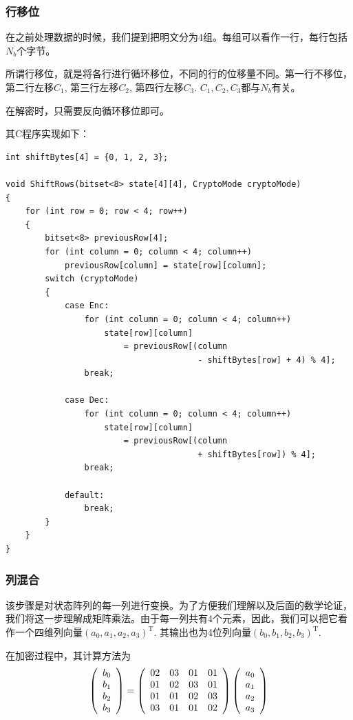 \subsubsection{行移位}
在之前处理数据的时候，我们提到把明文分为4组。每组可以看作一行，每行包括$N_b$个字节。\par
所谓行移位，就是将各行进行循环移位，不同的行的位移量不同。第一行不移位，第二行左移$C_1$, 第三行左移$C_2$, 第四行左移$C_3$. $C_1, C_2, C_3$都与$N_b$有关。\par
在解密时，只需要反向循环移位即可。\par
其C程序实现如下：
\begin{prove}
\begin{verbatim}
int shiftBytes[4] = {0, 1, 2, 3};

void ShiftRows(bitset<8> state[4][4], CryptoMode cryptoMode)
{
    for (int row = 0; row < 4; row++)
    {
        bitset<8> previousRow[4];
        for (int column = 0; column < 4; column++)
            previousRow[column] = state[row][column];
        switch (cryptoMode)
        {
            case Enc:
                for (int column = 0; column < 4; column++)
                    state[row][column]
                        = previousRow[(column
                                       - shiftBytes[row] + 4) % 4];
                break;
                
            case Dec:
                for (int column = 0; column < 4; column++)
                    state[row][column]
                        = previousRow[(column
                                       + shiftBytes[row]) % 4];
                break;
                
            default:
                break;
        }
    }
}
\end{verbatim}
\end{prove}
\subsubsection{列混合}
该步骤是对状态阵列的每一列进行变换。为了方便我们理解以及后面的数学论证，我们将这一步理解成矩阵乘法。由于每一列共有4个元素，因此，我们可以把它看作一个四维列向量$(a_0, a_1, a_2, a_3)^{\mathrm{T}}$. 其输出也为4位列向量$(b_0, b_1, b_2, b_3)^{\mathrm{T}}$.\par
在加密过程中，其计算方法为
\begin{equation}
\left( {\begin{array}{c}b_0\\b_1\\b_2\\b_3\end{array}}\right)=\left( {\begin{array}{cccc}02&03&01&01\\01&02&03&01\\01&01&02&03\\03&01&01&02\end{array}}\right)\left( {\begin{array}{c}a_0\\a_1\\a_2\\a_3\end{array}}\right)
\end{equation}

